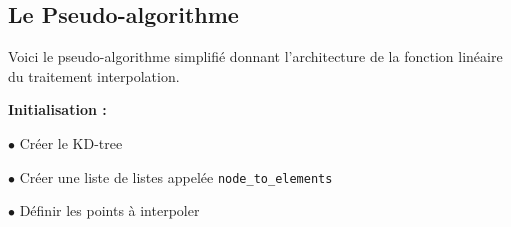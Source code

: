 \subsection{Le Pseudo-algorithme}



Voici le pseudo-algorithme simplifié donnant l'architecture de la fonction linéaire du traitement interpolation.

\vspace{0.5cm}

\textbf{Initialisation :}

$\bullet$ Créer le KD-tree

$\bullet$ Créer une liste de listes appelée \texttt{node\_to\_elements}

$\bullet$ Définir les points à interpoler

\vspace{0.5cm}

